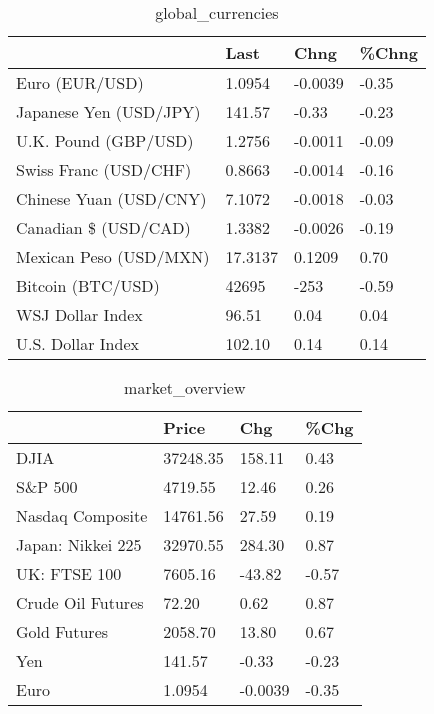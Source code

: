 \documentclass{article}%
\begin{document}
%


\begin{table}[htbp]%
\caption{global\_currencies}%
\centering%
\begin{adjustbox}{width=1\textwidth}%
\begin{tabular}{llll}
\toprule
                       &    Last &    Chng & \%Chng \\
\midrule
        Euro (EUR/USD) &  1.0954 & -0.0039 & -0.35 \\
Japanese Yen (USD/JPY) &  141.57 &   -0.33 & -0.23 \\
  U.K. Pound (GBP/USD) &  1.2756 & -0.0011 & -0.09 \\
 Swiss Franc (USD/CHF) &  0.8663 & -0.0014 & -0.16 \\
Chinese Yuan (USD/CNY) &  7.1072 & -0.0018 & -0.03 \\
  Canadian \$ (USD/CAD) &  1.3382 & -0.0026 & -0.19 \\
Mexican Peso (USD/MXN) & 17.3137 &  0.1209 &  0.70 \\
     Bitcoin (BTC/USD) &   42695 &    -253 & -0.59 \\
      WSJ Dollar Index &   96.51 &    0.04 &  0.04 \\
     U.S. Dollar Index &  102.10 &    0.14 &  0.14 \\
\bottomrule
\end{tabular}
%
\end{adjustbox}%
\end{table}

%


\begin{table}[htbp]%
\caption{market\_overview}%
\centering%
\begin{adjustbox}{width=1\textwidth}%
\begin{tabular}{llll}
\toprule
                  &    Price &     Chg &  \%Chg \\
\midrule
             DJIA & 37248.35 &  158.11 &  0.43 \\
          S\&P 500 &  4719.55 &   12.46 &  0.26 \\
 Nasdaq Composite & 14761.56 &   27.59 &  0.19 \\
Japan: Nikkei 225 & 32970.55 &  284.30 &  0.87 \\
     UK: FTSE 100 &  7605.16 &  -43.82 & -0.57 \\
Crude Oil Futures &    72.20 &    0.62 &  0.87 \\
     Gold Futures &  2058.70 &   13.80 &  0.67 \\
              Yen &   141.57 &   -0.33 & -0.23 \\
             Euro &   1.0954 & -0.0039 & -0.35 \\
\bottomrule
\end{tabular}
%
\end{adjustbox}%
\end{table}

%
\end{document}
